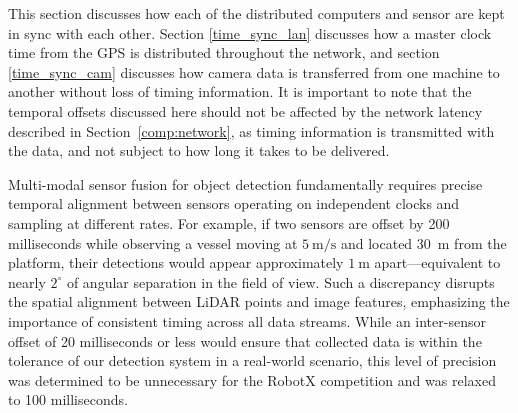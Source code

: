 \documentclass[../main.tex]{subfiles}
\begin{document}

This section discusses how each of the distributed computers and sensor are kept in sync with each other.
Section \ref{time_sync_lan} discusses how a master clock time from the GPS is distributed throughout the network, and section \ref{time_sync_cam} discusses how camera data is transferred from one machine to another without loss of timing information.
It is important to note that the temporal offsets discussed here should not be affected by the network latency described in Section~\ref{comp:network}, as timing information is transmitted with the data, and not subject to how long it takes to be delivered. 



Multi-modal sensor fusion for object detection fundamentally requires precise temporal alignment between sensors operating on independent clocks and sampling at different rates.  
For example, if two sensors are offset by 200 milliseconds while observing a vessel moving at $5~\mathrm{m/s}$ and located 30~m from the platform, their detections would appear approximately $1~\mathrm{m}$ apart—equivalent to nearly $2^{\circ}$ of angular separation in the field of view.  
Such a discrepancy disrupts the spatial alignment between LiDAR points and image features, emphasizing the importance of consistent timing across all data streams.
While an inter-sensor offset of 20 milliseconds or less would ensure that collected data is within the tolerance of our detection system in a real-world scenario, this level of precision was determined to be unnecessary for the RobotX competition and was relaxed to 100 milliseconds.
\end{document}
